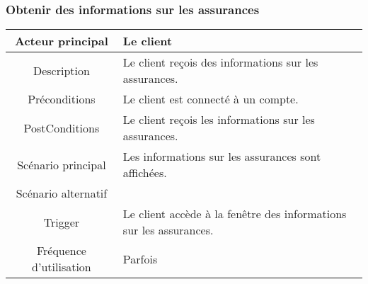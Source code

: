 \documentclass{article}
\begin{document}
\subsubsection{Obtenir des informations sur les assurances}
\begin{table}[h]
    \begin{tabular}{|c|p{10cm}|}
       \hline
       Acteur principal&Le client\\
       \hline
       Description&Le client reçois des informations sur les assurances.\\
       \hline
       Préconditions&Le client est connecté à un compte.\\
       \hline
       PostConditions&Le client reçois les informations sur les assurances.\\
       \hline
       Scénario principal&Les informations sur les assurances sont affichées.\\
       \hline
       Scénario alternatif&\\
       \hline
       Trigger&Le client accède à la fenêtre des informations sur les assurances.\\
       \hline
       Fréquence d'utilisation&Parfois\\
       \hline
    \end{tabular}
 \end{table}

\newpage

\end{document}
